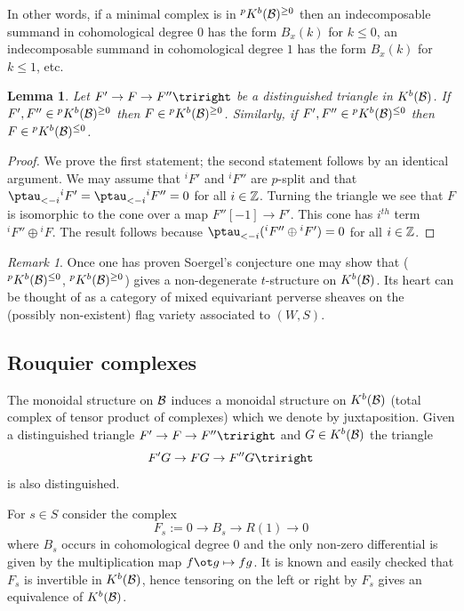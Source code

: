 \documentclass[11pt]{amsart}
\numberwithin{equation}{section}
\def\to{\rightarrow}
\newtheorem{lem}[thm]{Lemma}
\theoremstyle{definition}
\theoremstyle{remark}
\newtheorem{remark}[thm]{Remark}
\begin{document}
{In other words, if a minimal complex is in ${}^p K^b({\mathcal{B}})^{\ge 0}$ then an indecomposable summand in cohomological degree $0$ has the form $B_x(k)$ for $k \le 0$, an
indecomposable summand in cohomological degree $1$ has the form $B_x(k)$ for $k \le 1$, etc.

\begin{lem} \label{lem:middle term} Let $F' \to F \to F'' \triright$ be a distinguished triangle in $K^b({\mathcal{B}})$. If $F', F'' \in {}^pK^b({\mathcal{B}})^{\ge 0}$
then $F \in {}^pK^b({\mathcal{B}})^{\ge 0}$. Similarly, if $F', F'' \in {}^pK^b({\mathcal{B}})^{\le 0}$ then $F \in {}^pK^b({\mathcal{B}})^{\le 0}$. \end{lem}

\begin{proof} We prove the first statement; the second statement follows by an identical argument. We may assume that ${}^iF'$ and ${}^iF''$ are $p$-split and that $\ptau_{<
-i}{}^iF' = \ptau_{<-i}{}^iF'' =0$ for all $i \in {\mathbb{Z}}$. Turning the triangle we see that $F$ is isomorphic to the cone over a map $F''[-1] \to F'$. This cone has $i^{th}$
term ${}^iF'' \oplus {}^iF$. The result follows because
$\ptau_{<-i}({}^iF'' \oplus {}^iF') = 0$ for all $i \in {\mathbb{Z}}$. \end{proof}

\begin{remark} Once one has proven Soergel's conjecture one may show
  that (${}^p K^b({\mathcal{B}})^{\le 0}$, ${}^p K^b({\mathcal{B}})^{\ge 0}$) gives a
  non-degenerate $t$-structure on $K^b({\mathcal{B}})$. Its
heart can be thought of as a category of mixed equivariant perverse sheaves on the (possibly non-existent) flag variety associated to $(W,S)$. \end{remark}

\subsection{Rouquier complexes}

The monoidal structure on ${\mathcal{B}}$ induces a monoidal structure on
$K^b({\mathcal{B}})$ (total complex of tensor product of complexes) which we denote by juxtaposition.
Given a distinguished triangle $F' \to F \to F'' \triright$
and $G \in K^b({\mathcal{B}})$ the triangle \[ F' G \to F G \to F'' G \triright \] is also distinguished.

For $s \in S$ consider the complex \[ F_s:= 0 \to B_s \to R(1) \to 0 \] where $B_s$ occurs in cohomological degree 0 and the only non-zero differential is given by the
multiplication map $f \ot g \mapsto fg$. It is known and easily
checked that $F_s$ is invertible in $K^b({\mathcal{B}})$, hence tensoring on the
left or right by $F_s$ gives an equivalence of
$K^b({\mathcal{B}})$.

}
\end{document}
